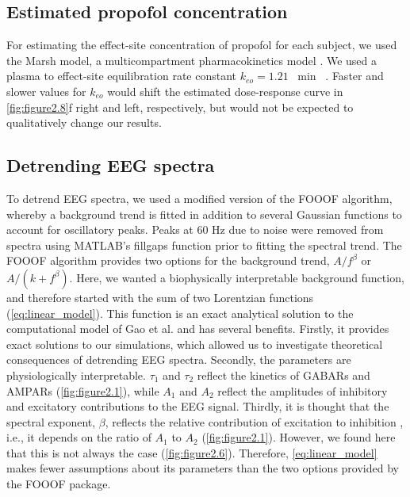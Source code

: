 \subsection{Estimated propofol concentration}
For estimating the effect-site concentration of propofol for each subject, we used the Marsh model, a multicompartment pharmacokinetics model \cite{Marsh1991}. We used a plasma to effect-site equilibration rate constant $k_{eo}=1.21$ \unit{\per\minute} ~\cite{Struys2000}. Faster and slower values for $k_{eo}$ would shift the estimated dose-response curve in \autoref{fig:figure2.8}f right and left, respectively, but would not be expected to qualitatively change our results.

\subsection{Detrending EEG spectra}
To detrend EEG spectra, we used a modified version of the FOOOF algorithm\cite{Donoghue2020}, whereby a background trend is fitted in addition to several Gaussian functions to account for oscillatory peaks. Peaks at 60 \unit{\hertz} due to noise were removed from spectra using MATLAB’s fillgaps function prior to fitting the spectral trend. The FOOOF algorithm provides two options for the background trend, $A/f^\beta$ or $A/\left(k+f^\beta\right)$. Here, we wanted a biophysically interpretable background function, and therefore started with the sum of two Lorentzian functions (\ref{eq:linear_model}). This function is an exact analytical solution to the computational model of Gao et al. \cite{Gao2017} and has several benefits. Firstly, it provides exact solutions to our simulations, which allowed us to investigate theoretical consequences of detrending EEG spectra. Secondly, the parameters are physiologically interpretable. $\tau_1$ and $\tau_2$ reflect the kinetics of GABARs and AMPARs (\autoref{fig:figure2.1}), while $A_1$ and $A_2$ reflect the amplitudes of inhibitory and excitatory contributions to the EEG signal. Thirdly, it is thought that the spectral exponent, $\beta$, reflects the relative contribution of excitation to inhibition \cite{Gao2017}, i.e., it depends on the ratio of $A_1$ to $A_2$ (\autoref{fig:figure2.1}). However, we found here that this is not always the case (\autoref{fig:figure2.6}). Therefore, \ref{eq:linear_model} makes fewer assumptions about its parameters than the two options provided by the FOOOF package.

